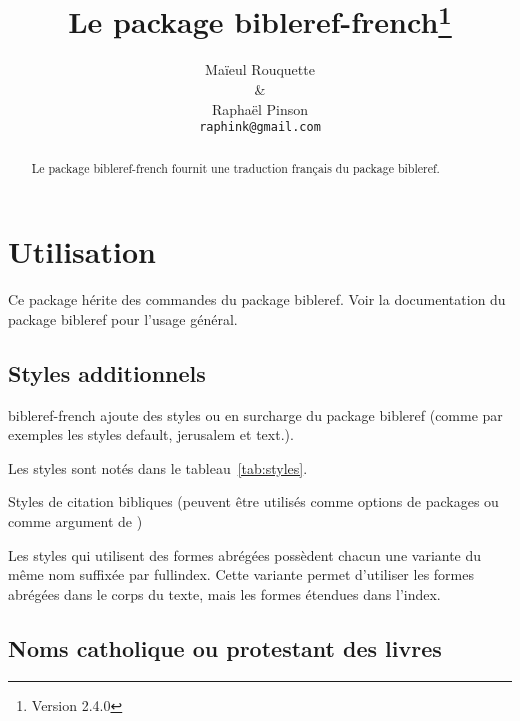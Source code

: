 \documentclass{ltxdoc}
\begin{document}
\shorthandoff{:}
\title{Le package \textsf{bibleref-french}\thanks{Version 2.4.0}}
\author{Ma\"ieul Rouquette \\ \& \\ Rapha\"el Pinson \\ \texttt{raphink@gmail.com}}

\maketitle
\begin{abstract}
Le  package \textsf{bibleref-french} fournit une traduction français du package \textsf{bibleref}.
\end{abstract}

\tableofcontents
\section{Utilisation}

Ce package hérite des commandes du package \textsf{bibleref}. Voir la documentation du package \textsf{bibleref} pour l'usage général.

\subsection{Styles additionnels}

\textsf{bibleref-french} ajoute des styles ou en surcharge du package \textsf{bibleref} (comme par exemples les styles \textsf{default}, \textsf{jerusalem} et \textsf{text}.).

Les styles sont notés dans le tableau~\ref{tab:styles}.

\begin{table}[tbh]
\caption{Styles de citation bibliques  (peuvent être utilisés comme options de  packages ou comme argument de  )}
\label{tab:styles}
\vspace{10pt}
\begin{center}

\end{center}
\end{table}

Les styles qui utilisent des formes abrégées possèdent chacun une variante du même nom suffixée par \textsf{fullindex}. Cette variante permet d'utiliser les formes abrégées dans le corps du texte, mais les formes étendues dans l'index.

\subsection{Noms catholique ou protestant des livres}
\end{document}
